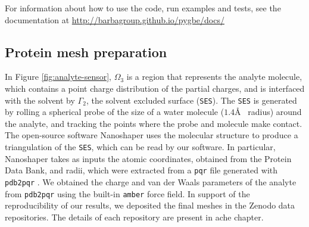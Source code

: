 For information about how to use the code, run examples and tests, see the
\pygbe documentation at \url{http://barbagroup.github.io/pygbe/docs/}

\subsection{Protein mesh preparation}
In Figure \ref{fig:analyte-sensor}, $\Omega_3$ is a region that represents the analyte molecule, which contains a point charge distribution of the partial charges, and is interfaced with the solvent by $\Gamma_2$, the solvent excluded surface (\texttt{SES}).
The \texttt{SES} is generated by rolling a spherical probe of the size of a water molecule ($1.4$\AA~ radius) around the analyte, and tracking the points where the probe and molecule make contact.
The open-source software Nanoshaper \cite{Nanoshaper} uses the molecular structure to produce a triangulation of the \texttt{SES}, which can be read by our software.
In particular, Nanoshaper takes as inputs the atomic coordinates, obtained from the Protein Data Bank, and radii, which were 
extracted from a \texttt{pqr} file generated with \texttt{pdb2pqr} \cite{Dolinsky04}.
We obtained the charge and van der Waals parameters of the analyte from \texttt{pdb2pqr} using the built-in \texttt{amber} force field.
In support of the reproducibility of our results, we deposited the final meshes in the Zenodo data repositories. The details of each repository 
are present in ache chapter. 
